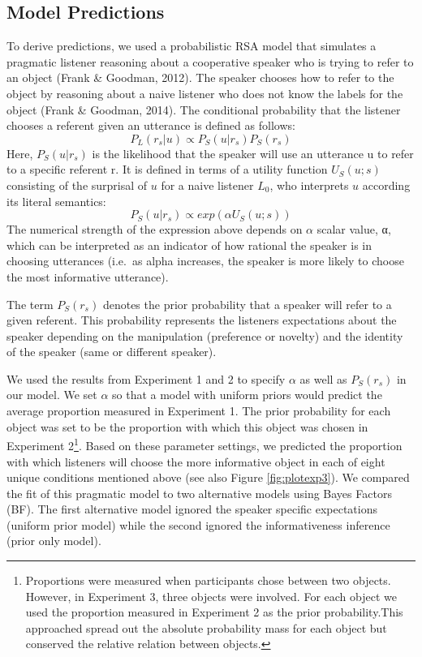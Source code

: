 \documentclass[10pt, letterpaper]{article}
\begin{document}
\subsection{Model Predictions}\label{model-predictions}

To derive predictions, we used a probabilistic RSA model that simulates
a pragmatic listener reasoning about a cooperative speaker who is trying
to refer to an object (Frank \& Goodman, 2012). The speaker chooses how
to refer to the object by reasoning about a naive listener who does not
know the labels for the object (Frank \& Goodman, 2014). The conditional
probability that the listener chooses a referent given an utterance is
defined as follows: \[P_L(r_s|u)\propto P_S(u|r_s)P_S(r_s)\] Here,
\(P_S(u|r_s)\) is the likelihood that the speaker will use an utterance
u to refer to a specific referent r. It is defined in terms of a utility
function \(U_S(u;s)\) consisting of the surprisal of \(u\) for a naive
listener \(L_0\), who interprets \(u\) according its literal semantics:
\[P_S(u|r_s)\propto exp(\alpha U_S(u;s))\] The numerical strength of the
expression above depends on \(\alpha\) scalar value, α, which can be
interpreted as an indicator of how rational the speaker is in choosing
utterances (i.e.~as alpha increases, the speaker is more likely to
choose the most informative utterance).

The term \(P_S(r_s)\) denotes the prior probability that a speaker will
refer to a given referent. This probability represents the listeners
expectations about the speaker depending on the manipulation (preference
or novelty) and the identity of the speaker (same or different speaker).

We used the results from Experiment 1 and 2 to specify \(\alpha\) as
well as \(P_S(r_s)\) in our model. We set \(\alpha\) so that a model
with uniform priors would predict the average proportion measured in
Experiment 1. The prior probability for each object was set to be the
proportion with which this object was chosen in Experiment
2\footnote{Proportions were measured when participants chose between two objects. However, in Experiment 3, three objects were involved. For each object we used the proportion measured in Experiment 2 as the prior probability.This approached spread out the absolute probability mass for each object but conserved the relative relation between objects.}.
Based on these parameter settings, we predicted the proportion with
which listeners will choose the more informative object in each of eight
unique conditions mentioned above (see also Figure \ref{fig:plotexp3}).
We compared the fit of this pragmatic model to two alternative models
using Bayes Factors (BF). The first alternative model ignored the
speaker specific expectations (uniform prior model) while the second
ignored the informativeness inference (prior only model).
\end{document}
